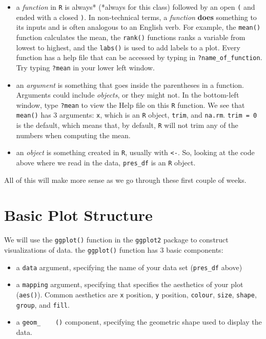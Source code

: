 \documentclass[
]{book}
\providecommand{\tightlist}{%
  \setlength{\itemsep}{0pt}\setlength{\parskip}{0pt}}
\begin{document}
\begin{itemize}
\item
  a \emph{function} in \texttt{R} is always* (*always for this class) followed by an open \texttt{(} and ended with a closed \texttt{)}. In non-technical terms, a \emph{function} \textbf{does} something to its inputs and is often analogous to an English verb. For example, the \texttt{mean()} function calculates the mean, the \texttt{rank()} functions ranks a variable from lowest to highest, and the \texttt{labs()} is used to add labels to a plot. Every function has a help file that can be accessed by typing in \texttt{?name\_of\_function}. Try typing \texttt{?mean} in your lower left window.
\item
  an \emph{argument} is something that goes inside the parentheses in a function. Arguments could include \emph{objects}, or they might not. In the bottom-left window, type \texttt{?mean} to view the Help file on this \texttt{R} function. We see that \texttt{mean()} has 3 arguments: \texttt{x}, which is an \texttt{R} object, \texttt{trim}, and \texttt{na.rm}. \texttt{trim\ =\ 0} is the default, which means that, by default, \texttt{R} will not trim any of the numbers when computing the mean.
\item
  an \emph{object} is something created in \texttt{R}, usually with \texttt{\textless{}-}. So, looking at the code above where we read in the data, \texttt{pres\_df} is an \texttt{R} object.
\end{itemize}

All of this will make more sense as we go through these first couple of weeks.

\hypertarget{basic-plot-structure}{%
\section{Basic Plot Structure}\label{basic-plot-structure}}

We will use the \texttt{ggplot()} function in the \texttt{ggplot2} package to construct visualizations of data. the \texttt{ggplot()} function has 3 basic components:

\begin{itemize}
\tightlist
\item
  a \texttt{data} argument, specifying the name of your data set (\texttt{pres\_df} above)
\item
  a \texttt{mapping} argument, specifying that specifies the aesthetics of your plot (\texttt{aes()}). Common aesthetics are \texttt{x} position, \texttt{y} position, \texttt{colour}, \texttt{size}, \texttt{shape}, \texttt{group}, and \texttt{fill}.
\item
  a \texttt{geom\_\ \ \ \ ()} component, specifying the geometric shape used to display the data.
\end{itemize}
\end{document}
